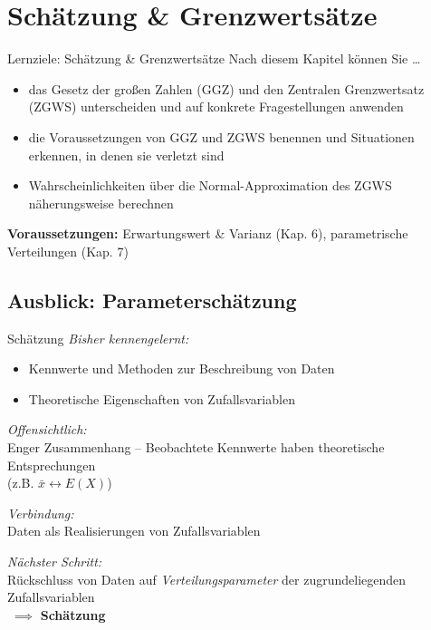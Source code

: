 \documentclass[
  10pt,
  ignorenonframetext,
]{beamer}
\providecommand{\tightlist}{%
  \setlength{\itemsep}{0pt}\setlength{\parskip}{0pt}}
\begin{document}
\hypertarget{schuxe4tzung-grenzwertsuxe4tze}{%
\section{Schätzung \&
Grenzwertsätze}\label{schuxe4tzung-grenzwertsuxe4tze}}

\begin{frame}{Lernziele: Schätzung \& Grenzwertsätze}
\protect\hypertarget{lernziele-schuxe4tzung-grenzwertsuxe4tze}{}
Nach diesem Kapitel können Sie \ldots{}

\begin{itemize}
\tightlist
\item
  das Gesetz der großen Zahlen (GGZ) und den Zentralen Grenzwertsatz
  (ZGWS) unterscheiden und auf konkrete Fragestellungen anwenden
\item
  die Voraussetzungen von GGZ und ZGWS benennen und Situationen
  erkennen, in denen sie verletzt sind
\item
  Wahrscheinlichkeiten über die Normal-Approximation des ZGWS
  näherungsweise berechnen
\end{itemize}

\vspace{1em}

\textbf{Voraussetzungen:} Erwartungswert \& Varianz (Kap. 6),
parametrische Verteilungen (Kap. 7)
\end{frame}

\hypertarget{ausblick-parameterschuxe4tzung}{%
\subsection{Ausblick:
Parameterschätzung}\label{ausblick-parameterschuxe4tzung}}

\begin{frame}{Schätzung}
\protect\hypertarget{schuxe4tzung}{}
\emph{Bisher kennengelernt:}

\begin{itemize}
\tightlist
\item
  Kennwerte und Methoden zur Beschreibung von Daten
\item
  Theoretische Eigenschaften von Zufallsvariablen
\end{itemize}

\emph{Offensichtlich:}\\
Enger Zusammenhang -- Beobachtete Kennwerte haben theoretische
Entsprechungen\\
(z.B. \(\bar x \leftrightarrow E(X)\))

\emph{Verbindung:}\\
Daten als Realisierungen von Zufallsvariablen

\emph{Nächster Schritt:}\\
Rückschluss von Daten auf \emph{Verteilungsparameter} der
zugrundeliegenden Zufallsvariablen\\
\(\; \implies\) \textbf{Schätzung}
\end{frame}
\end{document}
